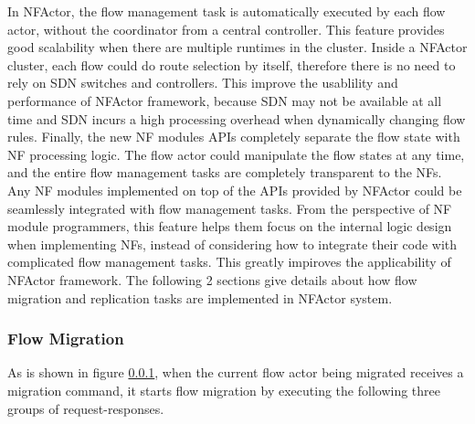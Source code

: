 In NFActor, the flow management task is automatically executed by each flow actor, without the coordinator from a central controller. This feature provides good scalability when there are multiple runtimes in the cluster. Inside a NFActor cluster, each flow could do route selection by itself, therefore there is no need to rely on SDN switches and controllers. This improve the usablility and performance of NFActor framework, because SDN may not be available at all time and SDN incurs a high processing overhead when dynamically changing flow rules. Finally, the new NF modules APIs completely separate the flow state with NF processing logic. The flow actor could manipulate the flow states at any time, and the entire flow management tasks are completely transparent to the NFs. Any NF modules implemented on top of the APIs provided by NFActor could be seamlessly integrated with flow management tasks. From the perspective of NF module programmers, this feature helps them focus on the internal logic design when implementing NFs, instead of considering how to integrate their code with complicated flow management tasks. This greatly impiroves the applicability of NFActor framework. The following 2 sections give details about how flow migration and replication tasks are implemented in NFActor system.

\subsubsection{Flow Migration}
As is shown in figure \ref{}, when the current flow actor being migrated receives a migration command, it starts flow migration by executing the following three groups of request-responses.

